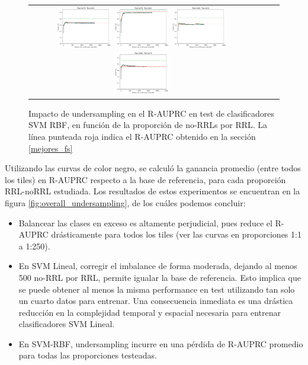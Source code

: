 \begin{figure}[h!]
\begin{tabular}{cccc}
\includegraphics[width=0.25\textwidth]{Kap7/train=b278_test=b234_rbf_individual_curves.png}  \includegraphics[width=0.25\textwidth]{Kap7/train=b278_test=b261_rbf_individual_curves.png} 
 \includegraphics[width=0.25\textwidth]{Kap7/train=b360_test=b234_rbf_individual_curves.png}  \includegraphics[width=0.25\textwidth]{Kap7/train=b360_test=b278_rbf_individual_curves.png} 
\end{tabular}
\caption{Impacto de undersampling en el R-AUPRC en test de clasificadores SVM RBF, en función de la proporción de no-RRLs por RRL. La línea punteada roja indica el R-AUPRC obtenido en la sección \protect\ref{mejores_fs}}
\label{fig:svmk_undersample}
\end{figure}

Utilizando las curvas de color negro, se calculó la ganancia promedio (entre todos los tiles) en R-AUPRC respecto a la base de referencia, para cada proporción RRL-noRRL estudiada. Los resultados de estos experimentos se encuentran en la figura \ref{fig:overall_undersampling}, de los cuáles podemos concluir:
\begin{itemize}
\item Balancear las clases en exceso es altamente perjudicial, pues reduce el R-AUPRC drásticamente para todos los tiles (ver las curvas en proporciones 1:1 a 1:250).
\item En SVM Lineal, corregir el imbalance de forma moderada, dejando al menos 500 no-RRL por RRL, permite igualar la base de referencia. Esto implica que se puede obtener al menos la misma performance en test utilizando tan solo un cuarto datos para entrenar. Una consecuencia inmediata es una drástica reducción en la complejidad temporal y espacial necesaria para entrenar clasificadores SVM Lineal.
\item En SVM-RBF, undersampling incurre en una pérdida de R-AUPRC promedio para todas las proporciones testeadas.
\end{itemize}

